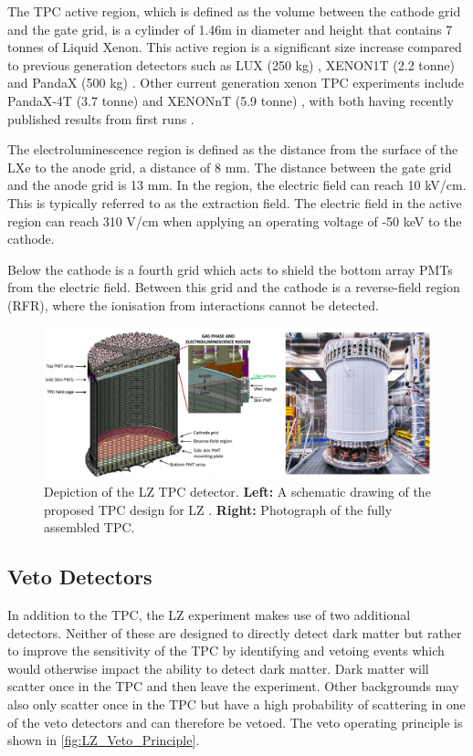 \par
The TPC active region, which is defined as the volume between the cathode grid and the gate grid, is a cylinder of 1.46m in diameter and height that contains 7 tonnes of Liquid Xenon.
This active region is a significant size increase compared to previous generation detectors such as LUX (250 kg) \cite{lux_ref}, XENON1T (2.2 tonne) \cite{xenon1t_ref} and PandaX (500 kg) \cite{pandax_ref}.
Other current generation xenon TPC experiments include PandaX-4T (3.7 tonne) \cite{pandax_4t_ref} and XENONnT (5.9 tonne) \cite{xenonnt_projected_sensitivty_ref}, with both having recently published results from first runs \cite{pandax_4t_sr1_ref,xenonnt_sr1_er_ref}. 
\par
The electroluminescence region is defined as the distance from the surface of the LXe to the anode grid, a distance of 8 mm.
The distance between the gate grid and the anode grid is 13 mm.
In the region, the electric field can reach 10 kV/cm.
This is typically referred to as the extraction field.
The electric field in the active region can reach 310 V/cm when applying an operating voltage of -50 keV to the cathode.
\par
Below the cathode is a fourth grid which acts to shield the bottom array PMTs from the electric field.
Between this grid and the cathode is a reverse-field region (RFR), where the ionisation from interactions cannot be detected.


\begin{figure}
\includegraphics[width=\columnwidth]{Figures/LZ/lz_tpc_schematic.png}%
\caption{Depiction of the LZ TPC detector.
         \textbf{Left:} A schematic drawing of the proposed TPC design for LZ \cite{LZ_TechnicalDesignReview_ref}.
         \textbf{Right:} Photograph of the fully assembled TPC.
}
\label{fig:lz_tpc_schematic}
\end{figure}


\subsection{Veto Detectors}
\label{sec:lz_veto_detectors}
\par
In addition to the TPC, the LZ experiment makes use of two additional detectors.
Neither of these are designed to directly detect dark matter but rather to improve the sensitivity of the TPC by identifying and vetoing events which would otherwise impact the ability to detect dark matter.
Dark matter will scatter once in the TPC and then leave the experiment.
Other backgrounds may also only scatter once in the TPC but have a high probability of scattering in one of the veto detectors and can therefore be vetoed.
The veto operating principle is shown in \autoref{fig:LZ_Veto_Principle}.

